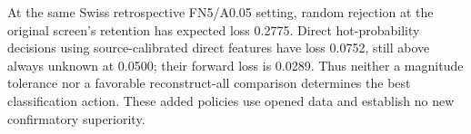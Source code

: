 At the same Swiss retrospective FN5/A0.05 setting, random rejection at the original screen's retention has expected loss 0.2775. Direct hot-probability decisions using source-calibrated direct features have loss 0.0752, still above always unknown at 0.0500; their forward loss is 0.0289. Thus neither a magnitude tolerance nor a favorable reconstruct-all comparison determines the best classification action. These added policies use opened data and establish no new confirmatory superiority.
